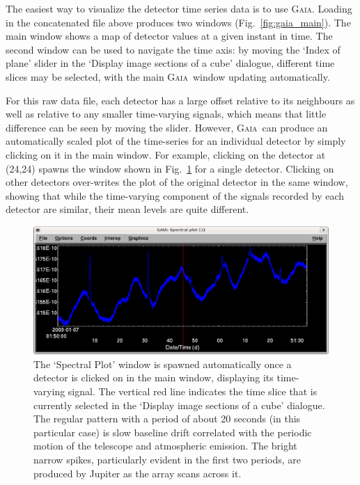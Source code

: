 \documentclass[twoside,11pt]{article}
\newcommand{\gaia}{\xref{\textsc{Gaia}}{sun214}{}}
\newcommand{\xref}[3]{#1}
\renewcommand{\_}{\texttt{\symbol{95}}}
\begin{document}
The easiest way to visualize the detector time series data is to use
\gaia. Loading in the concatenated file above produces two windows
(Fig.~\ref{fig:gaia_main}). The main window shows a map of detector
values at a given instant in time. The second window can be used to
navigate the time axis: by moving the `Index of plane' slider in the
`Display image sections of a cube' dialogue, different time slices may
be selected, with the main \gaia\ window updating automatically.

For this raw data file, each detector has a large offset relative to
its neighbours as well as relative to any smaller time-varying
signals, which means that little difference can be seen by moving the
slider. However, \gaia\ can produce an automatically scaled plot of
the time-series for an individual detector by simply clicking on it in
the main window. For example, clicking on the detector at (24,24)
spawns the window shown in Fig.~\ref{fig:gaia_spec} for a single
detector. Clicking on other detectors over-writes the plot of the
original detector in the same window, showing that while the
time-varying component of the signals recorded by each detector are
similar, their mean levels are quite different.

\begin{figure}
\begin{center}
\includegraphics[width=0.7\linewidth]{gaia_spec}
\caption{The `Spectral Plot' window is spawned automatically once a
  detector is clicked on in the main window, displaying its
  time-varying signal. The vertical red line indicates the time slice
  that is currently selected in the `Display image sections of a cube'
  dialogue. The regular pattern with a period of about 20 seconds (in
  this particular case) is slow baseline drift correlated with the
  periodic motion of the telescope and atmospheric emission. The
  bright narrow spikes, particularly evident in the first two periods,
  are produced by Jupiter as the array scans across it.}
\label{fig:gaia_spec}
\end{center}
\end{figure}
\end{document}
